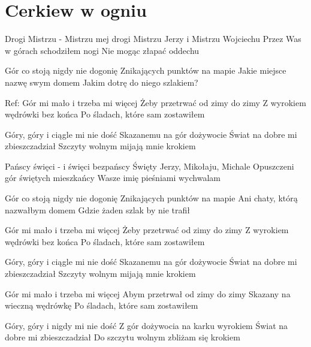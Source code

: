 \section{Cerkiew w ogniu}
\noindent %
\begin{minipage}[t]{\dimexpr.4\textwidth-.4\columnsep}
    Drogi Mistrzu - Mistrzu mej drogi
    Mistrzu Jerzy i Mistrzu Wojciechu
    Przez Was w górach schodziłem nogi
    Nie mogąc złapać oddechu

    Gór co stoją nigdy nie dogonię
    Znikających punktów na mapie
    Jakie miejsce nazwę swym domem
    Jakim dotrę do niego szlakiem?

    Ref: Gór mi mało i trzeba mi więcej
    Żeby przetrwać od zimy do zimy
    Z wyrokiem wędrówki bez końca
    Po śladach, które sam zostawiłem

    Góry, góry i ciągle mi nie dość
    Skazanemu na gór dożywocie
    Świat na dobre mi zbieszczadział
    Szczyty wolnym mijają mnie krokiem

    Pańscy święci - i święci bezpańscy
    Święty Jerzy, Mikołaju, Michale
    Opuszczeni gór świętych mieszkańcy
    Wasze imię pieśniami wychwalam

    Gór co stoją nigdy nie dogonię
    Znikających punktów na mapie
    Ani chaty, którą nazwałbym domem
    Gdzie żaden szlak by nie trafił

    Gór mi mało i trzeba mi więcej
    Żeby przetrwać od zimy do zimy
    Z wyrokiem wędrówki bez końca
    Po śladach, które sam zostawiłem

    Góry, góry i ciągle mi nie dość
    Skazanemu na gór dożywocie
    Świat na dobre mi zbieszczadział
    Szczyty wolnym mijają mnie krokiem

    Gór mi mało i trzeba mi więcej
    Abym przetrwał od zimy do zimy
    Skazany na wieczną wędrówkę
    Po śladach, które sam zostawiłem

    Góry, góry i nigdy mi nie dość
    Z gór dożywocia na karku wyrokiem
    Świat na dobre mi zbieszczadział
    Do szczytu wolnym zbliżam się krokiem
\end{minipage}
\hfill
\begin{minipage}[t]{\dimexpr.05\textwidth-.05\columnsep}
    \ifchorded %
    \hfill\break
    \hfill\break
    \else
    \fi
\end{minipage}